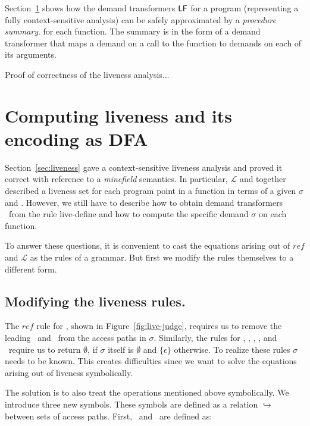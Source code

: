 \documentclass[9pt]{sigplanconf}
\begin{document}
Section~\ref{sec:computing}   shows   how   the  demand   transformers
$\mathsf{LF}$  for  a  program  (representing  a  fully  context-sensitive
analysis) can be safely approximated by a {\em procedure summary}. for
each function.   The summary  is in the  form of a  demand transformer
that maps a demand on a call to the function to demands on each of its
arguments.

{\color{red} Proof of correctness of the liveness analysis...}


\section{Computing liveness and its encoding as DFA}\label{sec:computing}
Section~\ref{sec:liveness} gave  a context-sensitive liveness analysis
and  {\color  {red}  proved  it  correct  with  reference  to  a  {\em
    minefield} semantics}.  In  particular, $\mathcal{L}$ and 
together described a liveness set for each program point in a function
in terms of  a given $\sigma$ and \Lfonly.  However,  we still have to
describe how to obtain demand transformers \Lfonly\ from the rule {\sc
  live-define} and how to compute the specific demand $\sigma$ on each
function.

To  answer these  questions, it  is convenient  to cast  the equations
arising out of $\mathit{ref}$  and $\mathcal{L}$ as the rules of a
grammar.   But first  we modify  the rules  themselves to  a different
form.

\subsection{Modifying the liveness rules.}

The      $\mathit{ref}$     rule      for     \CONS,      shown     in
Figure~\ref{fig:live-judge},  requires   us  to  remove   the  leading
\acar\ and \acdr\  from the access paths in  $\sigma$.  Similarly, the
rules for  \CAR, \CDR, \PRIM, \NULLQ,  and \SIF\ require  us to return
$\emptyset$, if  $\sigma$ itself is $\emptyset$ and
$\lbrace\epsilon\rbrace$ otherwise.  To  realize these rules
$\sigma$ needs to be known. This creates difficulties since we want to
solve the equations arising out of liveness symbolically.

The  solution  is  to   also  treat  the  operations  mentioned  above
symbolically.   We  introduce three  new  symbols.  These symbols  are
defined as a relation  $\hookrightarrow$ between sets of access paths.
First, \bcar\ and \bcdr\ are defined as:
\end{document}
